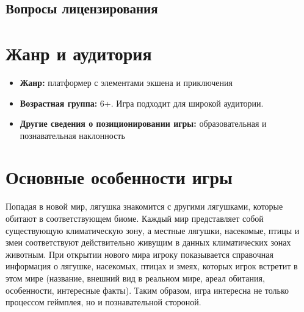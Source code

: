 \documentclass{article}
\begin{document}
\subsection*{Вопросы лицензирования}

\section{Жанр и аудитория}
\begin{itemize}
    \item \textbf{Жанр:} платформер с элементами экшена и приключения
    \item \textbf{Возрастная группа:} 6+. Игра подходит для широкой аудитории.
    \item \textbf{Другие сведения о позиционировании игры:} образовательная и познавательная наклонность
\end{itemize}

\section{Основные особенности игры}
Попадая в новой мир, лягушка знакомится с другими лягушками, которые обитают в соответствующем биоме. Каждый мир представляет собой существующую климатическую зону, а местные лягушки, насекомые, птицы и змеи соответствуют действительно живущим в данных климатических зонах животным. При открытии нового мира игроку показывается справочная информация о лягушке, насекомых, птицах и змеях, которых игрок встретит в этом мире (название, внешний вид в реальном мире, ареал обитания, особенности, интересные факты). Таким образом, игра интересна не только процессом геймплея, но и познавательной стороной.
\end{document}
